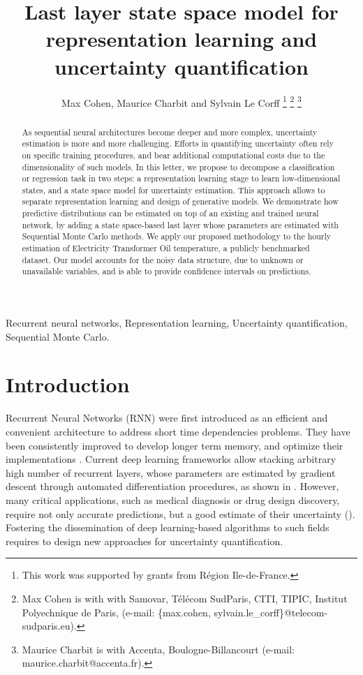 \documentclass[journal]{IEEEtran}
\title{Last layer state space model for representation learning and uncertainty quantification}
\author{Max Cohen, Maurice Charbit and Sylvain Le Corff
	\thanks{This work was supported by grants from Région Ile-de-France.}
	\thanks{Max Cohen is with with Samovar, T\'el\'ecom SudParis, CITI, TIPIC, Institut Polyechnique de Paris, (e-mail: \{max.cohen, sylvain.le\_corff\}@telecom-sudparis.eu).}
	\thanks{Maurice Charbit is with Accenta, Boulogne-Billancourt (e-mail: maurice.charbit@accenta.fr).}}
\begin{document}
\maketitle
\begin{abstract}
	As sequential neural architectures become deeper and more complex, uncertainty estimation is more and more challenging.
	Efforts in quantifying uncertainty often rely on specific training procedures, and bear additional computational costs due to the dimensionality of such models.
	In this letter, we propose to decompose a classification or regression task in two steps: a representation learning stage to learn low-dimensional states, and a state space model for uncertainty estimation.
	This approach allows to separate representation learning and design of generative models.
	We demonstrate how predictive distributions can be estimated on top of an existing and trained neural network, by adding a state space-based last layer whose parameters are estimated with Sequential Monte Carlo methods.
	We apply our proposed methodology to the hourly estimation of Electricity Transformer Oil temperature, a publicly benchmarked dataset.
	Our model accounts for the noisy data structure, due to unknown or unavailable variables, and is able to provide confidence intervals on predictions.
\end{abstract}

\begin{IEEEkeywords}
	Recurrent neural networks, Representation learning, Uncertainty quantification, Sequential Monte Carlo.
\end{IEEEkeywords}

\section{Introduction}
\label{sec:intro}

Recurrent Neural Networks (RNN) were first introduced as an efficient and convenient architecture to address short time dependencies problems.
They have been consistently improved to develop longer term memory, and optimize their implementations \cite{Bengio1994LearningLD,Hochreiter1997LongSM}. %
Current deep learning frameworks allow stacking arbitrary high number of recurrent layers, whose parameters are estimated by gradient descent through automated differentiation procedures, as shown in \cite{Graves2013SpeechRecognition}.
However, many critical applications, such as medical diagnosis or drug design discovery, require not only accurate predictions, but a good estimate of their uncertainty (\cite{Crowson2016AssessingCalibration, Mervin2020UncertaintyQuantification}).
Fostering the dissemination of deep learning-based algorithms to such fields requires to design new approaches for uncertainty quantification.
\end{document}
